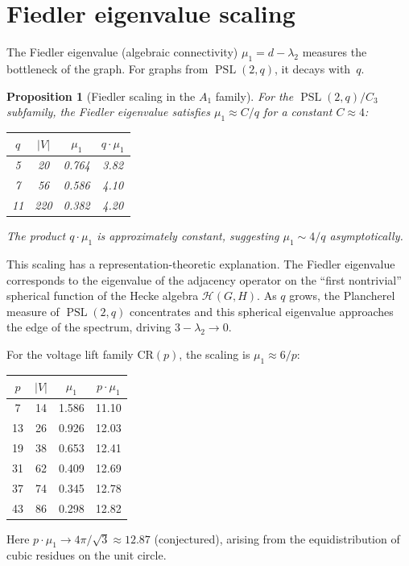 \documentclass[11pt,a4paper]{article}
\theoremstyle{plain}
\newtheorem{proposition}[theorem]{Proposition}
\theoremstyle{definition}
\theoremstyle{remark}
\newcommand{\PSL}{\operatorname{PSL}}
\begin{document}
\section{Fiedler eigenvalue scaling}

The Fiedler eigenvalue (algebraic connectivity) $\mu_1 = d - \lambda_2$
measures the bottleneck of the graph. For graphs from $\PSL(2,q)$, it
decays with~$q$.

\begin{proposition}[Fiedler scaling in the $A_1$ family]
For the $\PSL(2,q)/C_3$ subfamily, the Fiedler eigenvalue satisfies
$\mu_1 \approx C/q$ for a constant $C \approx 4$:
\begin{center}
\begin{tabular}{@{}c c c c@{}}
\toprule
$q$ & $|V|$ & $\mu_1$ & $q \cdot \mu_1$ \\
\midrule
5  &  20 & 0.764 & 3.82 \\
7  &  56 & 0.586 & 4.10 \\
11 & 220 & 0.382 & 4.20 \\
\bottomrule
\end{tabular}
\end{center}
The product $q \cdot \mu_1$ is approximately constant, suggesting
$\mu_1 \sim 4/q$ asymptotically.
\end{proposition}

This scaling has a representation-theoretic explanation. The Fiedler
eigenvalue corresponds to the eigenvalue of the adjacency operator on
the ``first nontrivial'' spherical function of the Hecke algebra
$\mathcal{H}(G, H)$. As $q$ grows, the Plancherel measure of
$\PSL(2,q)$ concentrates and this spherical eigenvalue approaches the
edge of the spectrum, driving $3 - \lambda_2 \to 0$.

For the voltage lift family $\mathrm{CR}(p)$, the scaling is
$\mu_1 \approx 6/p$:
\begin{center}
\begin{tabular}{@{}c c c c@{}}
\toprule
$p$ & $|V|$ & $\mu_1$ & $p \cdot \mu_1$ \\
\midrule
7  & 14 & 1.586 & 11.10 \\
13 & 26 & 0.926 & 12.03 \\
19 & 38 & 0.653 & 12.41 \\
31 & 62 & 0.409 & 12.69 \\
37 & 74 & 0.345 & 12.78 \\
43 & 86 & 0.298 & 12.82 \\
\bottomrule
\end{tabular}
\end{center}
Here $p \cdot \mu_1 \to 4\pi/\sqrt{3} \approx 12.87$ (conjectured),
arising from the equidistribution of cubic residues on the unit circle.
\end{document}
